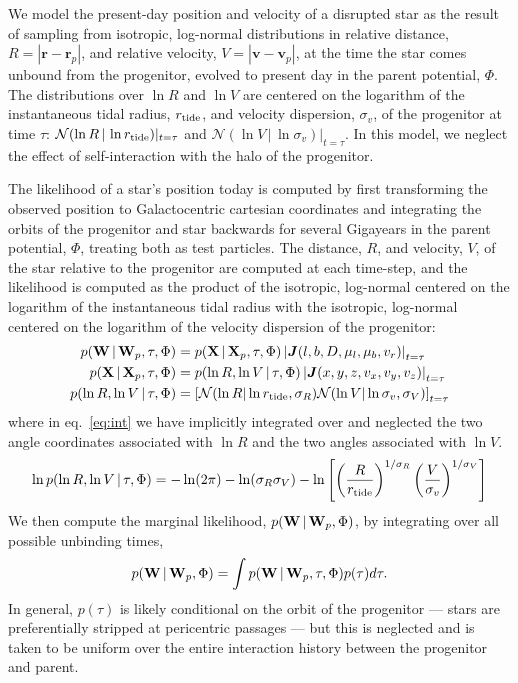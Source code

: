 \documentclass[letterpaper,12pt,preprint]{aastex}
\newcommand{\given}{\,|\,}
\newcommand{\jac}[1]{\left\vert \J{#1} \right\vert}
\newcommand{\D}{{\bf D}}
\newcommand{\W}{{\bf W}}
\newcommand{\X}{{\bf X}}
\newcommand{\J}{{\boldsymbol J}}
\newcommand{\rtide}{r_{\rm tide}}
\newcommand{\bs}{\boldsymbol}
\begin{document}
We model the present-day position and velocity of a disrupted star as the result of sampling from isotropic, log-normal distributions in relative distance, $R=\left\vert \bs{r}-\bs{r}_p \right\vert$, and relative velocity, $V=\left\vert \bs{v}-\bs{v}_p \right\vert$, at the time the star comes unbound from the progenitor, evolved to present day in the parent potential, $\Phi$. The distributions over $\ln R$ and $\ln V$ are centered on the logarithm of the instantaneous tidal radius, $\rtide$, and velocity dispersion, $\sigma_v$, of the progenitor at time $\tau$: $\mathcal{N}(\ln R \given \ln\rtide)\vert_{t=\tau}$ and $\mathcal{N}(\ln V \given \ln \sigma_v)\vert_{t=\tau}$. In this model, we neglect the effect of self-interaction with the halo of the progenitor. 

The likelihood of a star's position today is computed by first transforming the observed position to Galactocentric cartesian coordinates and integrating the orbits of the progenitor and star backwards for several Gigayears in the parent potential, $\Phi$, treating both as test particles. The distance, $R$, and velocity, $V$, of the star relative to the progenitor are computed at each time-step, and the likelihood is computed as the product of the isotropic, log-normal centered on the logarithm of the instantaneous tidal radius with the isotropic, log-normal centered on the logarithm of the velocity dispersion of the progenitor:
\begin{align}
	p(\W \given \W_p, \tau, \Phi) &= p(\X \given \X_p, \tau, \Phi) \jac{(l,b,D,\mu_l,\mu_b,v_r)}_{t=\tau}\\
	p(\X \given \X_p, \tau, \Phi) &= p(\ln R, \ln V \given \tau, \Phi) \jac{(x,y,z,v_x,v_y,v_z)}_{t=\tau}\label{eq:int} \\
	p(\ln R, \ln V \given \tau, \Phi) &= \left[\mathcal{N}(\ln R | \ln \rtide, \sigma_R)\mathcal{N}(\ln V | \ln \sigma_v, \sigma_V)\right]_{t=\tau}
\end{align}
where in eq.~\ref{eq:int} we have implicitly integrated over and neglected the two angle coordinates associated with $\ln R$ and the two angles associated with $\ln V$. 
\begin{align}
	\ln p(\ln R, \ln V \given \tau, \Phi) = -\ln(2\pi)-\ln(\sigma_R\sigma_V)-
		\ln\left[\left(\frac{R}{\rtide}\right)^{1/\sigma_R} \left(\frac{V}{\sigma_v}\right)^{1/\sigma_V}\right]
\end{align}
We then compute the marginal likelihood, $p(\W \given \W_p, \Phi)$, by integrating over all possible unbinding times,
\begin{align}
	p(\W \given \W_p, \Phi) = \int p(\W \given \W_p, \tau, \Phi)p(\tau) d\tau.
\end{align}
In general, $p(\tau)$ is likely conditional on the orbit of the progenitor --- stars are preferentially stripped at pericentric passages --- but this is neglected and is taken to be uniform over the entire interaction history between the progenitor and parent. 
\end{document}
